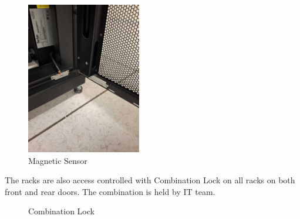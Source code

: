   \begin{figure}
    \includegraphics[width=5cm]{25.jpg}
    \centering
    \caption*{Magnetic Sensor}
  \end{figure}

  \newpage

The racks are also access controlled with Combination Lock on all racks on both front and rear doors. The combination is held by IT team.

\begin{figure}
    \centering
    \caption*{Combination Lock}
  \end{figure}

  \newpage
